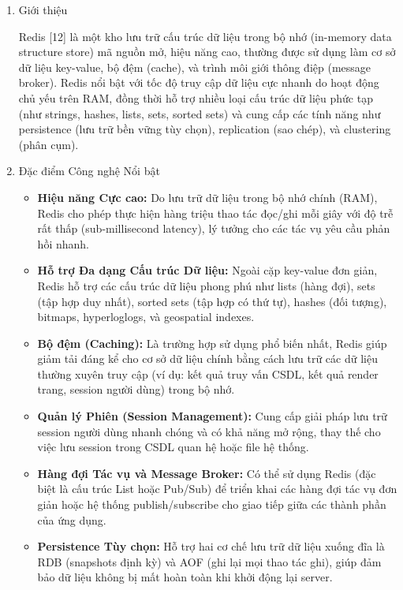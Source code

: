 \begin{enumerate}[label=\arabic*., font=\bfseries]
    \item Giới thiệu

    Redis [12] là một kho lưu trữ cấu trúc dữ liệu trong bộ nhớ (in-memory data structure store) mã nguồn mở, hiệu năng cao, thường được sử dụng làm cơ sở dữ liệu key-value, bộ đệm (cache), và trình môi giới thông điệp (message broker). Redis nổi bật với tốc độ truy cập dữ liệu cực nhanh do hoạt động chủ yếu trên RAM, đồng thời hỗ trợ nhiều loại cấu trúc dữ liệu phức tạp (như strings, hashes, lists, sets, sorted sets) và cung cấp các tính năng như persistence (lưu trữ bền vững tùy chọn), replication (sao chép), và clustering (phân cụm).

    \item Đặc điểm Công nghệ Nổi bật
    \begin{itemize}
        \item \textbf{Hiệu năng Cực cao:} Do lưu trữ dữ liệu trong bộ nhớ chính (RAM), Redis cho phép thực hiện hàng triệu thao tác đọc/ghi mỗi giây với độ trễ rất thấp (sub-millisecond latency), lý tưởng cho các tác vụ yêu cầu phản hồi nhanh.
        \item \textbf{Hỗ trợ Đa dạng Cấu trúc Dữ liệu:} Ngoài cặp key-value đơn giản, Redis hỗ trợ các cấu trúc dữ liệu phong phú như lists (hàng đợi), sets (tập hợp duy nhất), sorted sets (tập hợp có thứ tự), hashes (đối tượng), bitmaps, hyperloglogs, và geospatial indexes.
        \item \textbf{Bộ đệm (Caching):} Là trường hợp sử dụng phổ biến nhất, Redis giúp giảm tải đáng kể cho cơ sở dữ liệu chính bằng cách lưu trữ các dữ liệu thường xuyên truy cập (ví dụ: kết quả truy vấn CSDL, kết quả render trang, session người dùng) trong bộ nhớ.
        \item \textbf{Quản lý Phiên (Session Management):} Cung cấp giải pháp lưu trữ session người dùng nhanh chóng và có khả năng mở rộng, thay thế cho việc lưu session trong CSDL quan hệ hoặc file hệ thống.
        \item \textbf{Hàng đợi Tác vụ và Message Broker:} Có thể sử dụng Redis (đặc biệt là cấu trúc List hoặc Pub/Sub) để triển khai các hàng đợi tác vụ đơn giản hoặc hệ thống publish/subscribe cho giao tiếp giữa các thành phần của ứng dụng.
        \item \textbf{Persistence Tùy chọn:} Hỗ trợ hai cơ chế lưu trữ dữ liệu xuống đĩa là RDB (snapshots định kỳ) và AOF (ghi lại mọi thao tác ghi), giúp đảm bảo dữ liệu không bị mất hoàn toàn khi khởi động lại server.
    \end{itemize}


\end{enumerate}

